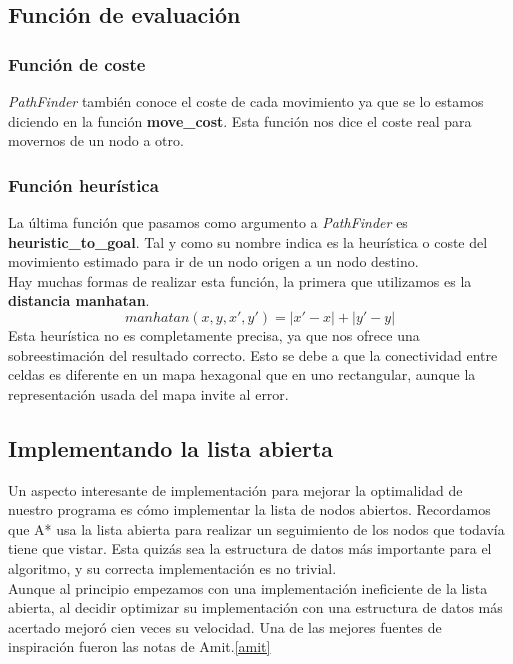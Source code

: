 \documentclass[a4paper,12pt,oneside]{book}
\begin{document}
\subsection{Función de evaluación}

\subsubsection{Función de coste}

{\it PathFinder} también conoce el coste de cada movimiento ya que se
lo estamos diciendo en la función {\bf move\_cost}. Esta función nos
dice el coste real para movernos de un nodo a otro. 

\subsubsection{Función heurística}

La última función que pasamos como argumento a {\it PathFinder} es
{\bf heuristic\_to\_goal}. Tal y como su nombre indica es la
heurística o coste del movimiento estimado para ir de un nodo origen a
un nodo destino.\\

Hay muchas formas de realizar esta función, la primera que utilizamos
es la {\bf distancia manhatan}.
$$ manhatan(x,y, x',y') = |x'-x|+|y'-y| $$
 Esta heurística no es completamente precisa,
ya que  nos ofrece una sobreestimación del resultado correcto. Esto se
debe a que la conectividad entre celdas es diferente en un mapa
hexagonal que en uno rectangular, aunque la representación usada del
mapa invite al error.

\subsection{Implementando la lista abierta}

Un aspecto interesante de implementación para mejorar la optimalidad
de nuestro programa es cómo implementar la lista de nodos
abiertos. Recordamos que A* usa la lista abierta para realizar un
seguimiento de los nodos que todavía tiene que vistar. Esta quizás sea
la estructura de datos más importante para el algoritmo, y su correcta
implementación es no trivial.\\

Aunque al principio empezamos con una implementación ineficiente de la
lista abierta, al decidir optimizar su implementación con una
estructura de datos más acertado mejoró cien veces su velocidad. Una
de las mejores fuentes de inspiración fueron las notas de
Amit.\ref{amit} \\
\end{document}
